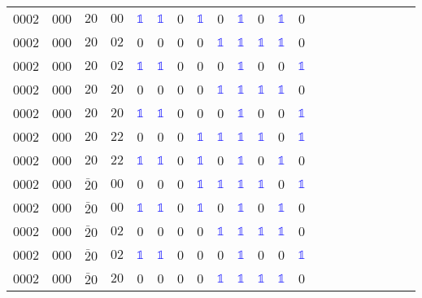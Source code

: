 \begin{longtable*}{c| cccccccccccccccccccc }
0002& 000& $20$& $00$& \textcolor{blue}{$\mathds{1}$}& \textcolor{blue}{$\mathds{1}$}& 0& \textcolor{blue}{$\mathds{1}$}& 0& \textcolor{blue}{$\mathds{1}$}& 0& \textcolor{blue}{$\mathds{1}$}& 0\\
0002& 000& $20$& $02$& 0& 0& 0& 0& \textcolor{blue}{$\mathds{1}$}& \textcolor{blue}{$\mathds{1}$}& \textcolor{blue}{$\mathds{1}$}& \textcolor{blue}{$\mathds{1}$}& 0\\
0002& 000& $20$& $02$& \textcolor{blue}{$\mathds{1}$}& \textcolor{blue}{$\mathds{1}$}& 0& 0& 0& \textcolor{blue}{$\mathds{1}$}& 0& 0& \textcolor{blue}{$\mathds{1}$}\\
0002& 000& $20$& $20$& 0& 0& 0& 0& \textcolor{blue}{$\mathds{1}$}& \textcolor{blue}{$\mathds{1}$}& \textcolor{blue}{$\mathds{1}$}& \textcolor{blue}{$\mathds{1}$}& 0\\
0002& 000& $20$& $20$& \textcolor{blue}{$\mathds{1}$}& \textcolor{blue}{$\mathds{1}$}& 0& 0& 0& \textcolor{blue}{$\mathds{1}$}& 0& 0& \textcolor{blue}{$\mathds{1}$}\\
0002& 000& $20$& $22$& 0& 0& 0& \textcolor{blue}{$\mathds{1}$}& \textcolor{blue}{$\mathds{1}$}& \textcolor{blue}{$\mathds{1}$}& \textcolor{blue}{$\mathds{1}$}& 0& \textcolor{blue}{$\mathds{1}$}\\
0002& 000& $20$& $22$& \textcolor{blue}{$\mathds{1}$}& \textcolor{blue}{$\mathds{1}$}& 0& \textcolor{blue}{$\mathds{1}$}& 0& \textcolor{blue}{$\mathds{1}$}& 0& \textcolor{blue}{$\mathds{1}$}& 0\\
0002& 000& $\bar{2}0$& $00$& 0& 0& 0& \textcolor{blue}{$\mathds{1}$}& \textcolor{blue}{$\mathds{1}$}& \textcolor{blue}{$\mathds{1}$}& \textcolor{blue}{$\mathds{1}$}& 0& \textcolor{blue}{$\mathds{1}$}\\
0002& 000& $\bar{2}0$& $00$& \textcolor{blue}{$\mathds{1}$}& \textcolor{blue}{$\mathds{1}$}& 0& \textcolor{blue}{$\mathds{1}$}& 0& \textcolor{blue}{$\mathds{1}$}& 0& \textcolor{blue}{$\mathds{1}$}& 0\\
0002& 000& $\bar{2}0$& $02$& 0& 0& 0& 0& \textcolor{blue}{$\mathds{1}$}& \textcolor{blue}{$\mathds{1}$}& \textcolor{blue}{$\mathds{1}$}& \textcolor{blue}{$\mathds{1}$}& 0\\
0002& 000& $\bar{2}0$& $02$& \textcolor{blue}{$\mathds{1}$}& \textcolor{blue}{$\mathds{1}$}& 0& 0& 0& \textcolor{blue}{$\mathds{1}$}& 0& 0& \textcolor{blue}{$\mathds{1}$}\\
0002& 000& $\bar{2}0$& $20$& 0& 0& 0& 0& \textcolor{blue}{$\mathds{1}$}& \textcolor{blue}{$\mathds{1}$}& \textcolor{blue}{$\mathds{1}$}& \textcolor{blue}{$\mathds{1}$}& 0\\

\end{longtable*}
